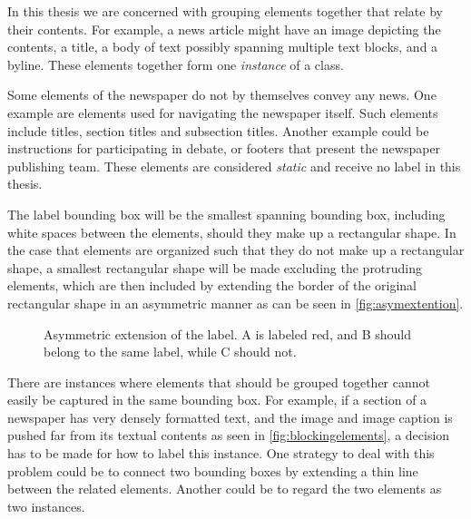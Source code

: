 \documentclass[oneside, english, bibtex]{kththesis}
\begin{document}
In this thesis we are concerned with grouping elements together that relate by their contents.
For example, a news article might have an image depicting the contents, a title, a body of text possibly spanning multiple text blocks, and a byline.
These elements together form one \textit{instance} of a class.

Some elements of the newspaper do not by themselves convey any news. One example are elements used for navigating the newspaper itself.
Such elements include titles, section titles and subsection titles. Another example could be instructions for participating in debate, or footers that present the newspaper publishing team.
These elements are considered \textit{static} and receive no label in this thesis.

The label bounding box will be the smallest spanning bounding box, including white spaces between the elements, should they make up a rectangular shape.
In the case that elements are organized such that they do not make up a rectangular shape, a smallest rectangular shape will be made excluding the protruding elements,
which are then included by extending the border of the original rectangular shape in an asymmetric manner as can be seen in \autoref{fig:asymextention}.

\begin{figure}[H]
\label{fig:asymextention}
\caption{Asymmetric extension of the label. A is labeled red, and B should belong to the same label, while C should not.}
\end{figure}

There are instances where elements that should be grouped together cannot easily be captured in the same bounding box.
For example, if a section of a newspaper has very densely formatted text, and the image and image caption is pushed far from its textual contents as seen in \autoref{fig:blockingelements}, a decision has to be made for how to label this instance.
One strategy to deal with this problem could be to connect two bounding boxes by extending a thin line between the related elements. Another could be to regard the two elements as two instances.
\end{document}
